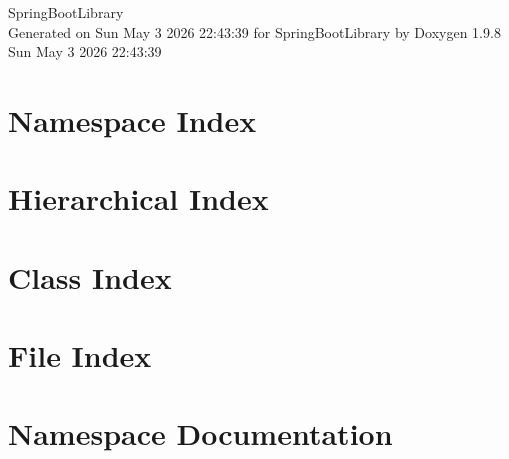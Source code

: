 \documentclass[twoside]{book}
\newcommand{\+}{\discretionary{\mbox{\scriptsize$\hookleftarrow$}}{}{}}
\newcommand{\clearemptydoublepage}{%
    \newpage{\pagestyle{empty}\cleardoublepage}%
  }
\begin{document}
  \raggedbottom
    \hypersetup{pageanchor=false,
                bookmarksnumbered=true,
                pdfencoding=unicode
               }
  \begin{titlepage}
  \vspace*{7cm}
  \begin{center}%
  {\Large Spring\+Boot\+Library}\\
  \vspace*{1cm}
  {\large Generated on Sun May 3 2026 22\+:43\+:39 for Spring\+Boot\+Library by Doxygen 1.9.8}\\
    \vspace*{0.5cm}
    {\small Sun May 3 2026 22:43:39}
  \end{center}
  \end{titlepage}
  \clearemptydoublepage
  \tableofcontents
  \clearemptydoublepage
  \hypersetup{pageanchor=true}
\chapter{Namespace Index}

\chapter{Hierarchical Index}

\chapter{Class Index}

\chapter{File Index}

\chapter{Namespace Documentation}








\end{document}
